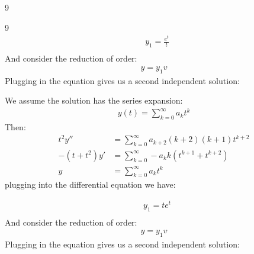 \begin{vv286}{9}
\begin{vv286_ms}{9}
      \begin{align*}
	&y_1=\frac{e^{t}}{t}\\
      \end{align*}
       And consider the reduction of order:
      \begin{align*}
	y=y_1v
      \end{align*}
      Plugging in the equation gives us a second independent solution:

   \item[(iii)]
   We assume the solution has the series expansion:
      \begin{align*}
	y(t)=\sum_{k=0}^{\infty}a_kt^k
      \end{align*}
      Then:
      \begin{align*}
	t^2y''&=\sum_{k=0}^{\infty}a_{k+2}(k+2)(k+1)t^{k+2}\\
	-(t+t^2) y'&=\sum_{k=0}^{\infty}-a_kk(t^{k+1}+t^{k+2})\\
	y&=\sum_{k=0}^{\infty} a_k t^k
      \end{align*}
      plugging into the differential equation we have:

      \begin{align*}
       &y_1=te^t\\
      \end{align*}
     And consider the reduction of order:
      \begin{align*}
	y=y_1v
      \end{align*}
      Plugging in the equation gives us a second independent solution:
    \end{vv286_ms}
\end{vv286}


